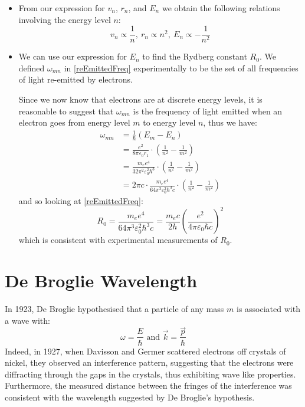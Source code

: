\documentclass[../main.tex]{subfiles}
\begin{document}
\begin{remark}
  \begin{itemize}
    \item From our expression for $v_n$, $r_n$, and $E_n$ we obtain the following relations involving the energy level $n$:
      \[
        v_n \propto \frac{1}{n},\ r_n \propto n^2,\ E_n \propto - \frac{1}{n^2}
      \]
    \item We can use our expression for $E_n$ to find the Rydberg constant $R_0$.
      We defined $\omega_{m n}$ in \cref{reEmittedFreq} experimentally to be the set of all frequencies of light re-emitted by electrons.

      Since we now know that electrons are at discrete energy levels, it is reasonable to suggest that $\omega_{mn}$ is the frequency of light emitted when an electron goes from energy level $m$ to energy level $n$, thus we have:
      \begin{align*}
        \omega_{mn} &= \frac{1}{\hbar}(E_m - E_n) \\
                    &= \frac{e^2}{8 \pi \varepsilon_0 r_1} \cdot \left(\frac{1}{n^2} - \frac{1}{m^2}\right) \\
                    &= \frac{m_e e^4}{32 \pi^2 \varepsilon^2_0 \hbar^3} \cdot \left(\frac{1}{n^2} - \frac{1}{m^2}\right) \\
                    &= 2\pi c \cdot \frac{m_e e^4}{64 \pi^3 \varepsilon^2_0 \hbar^3 c} \cdot \left(\frac{1}{n^2} - \frac{1}{m^2}\right)
      \end{align*}
      and so looking at \cref{reEmittedFreq}:
      \[
        R_0 = \frac{m_e e^4}{64 \pi^3 \varepsilon^2_0 \hbar^3 c} = \frac{m_e c}{2h}\left(\frac{e^2}{4\pi \varepsilon_0 \hbar c}\right)^2
      \]
      which is consistent with experimental measurements of $R_0$.
  \end{itemize}
\end{remark}
\section{De Broglie Wavelength} \label{deBroglieSec}
In 1923, De Broglie hypothesised that a particle of any mass $m$ is associated with a wave with:
\[
  \omega = \frac{E}{\hbar} \text{ and } \vec{k} = \frac{\vec{p}}{\hbar}
\]
Indeed, in 1927, when Davisson and Germer scattered electrons off crystals of nickel, they observed an interference pattern, suggesting that the electrons were diffracting through the gaps in the crystals, thus exhibiting wave like properties.
Furthermore, the measured distance between the fringes of the interference was consistent with the wavelength suggested by De Broglie's hypothesis.
\end{document}

